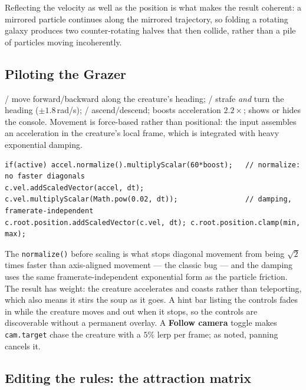 \documentclass[10pt,a4paper]{article}
\newcommand{\code}[1]{\texttt{\small #1}}
\newcommand{\keys}[1]{\textsf{\small\fbox{#1}}}
\begin{document}
\noindent Reflecting the velocity as well as the position is what makes the result coherent: a mirrored
particle continues along the mirrored trajectory, so folding a rotating galaxy produces two
counter-rotating halves that then collide, rather than a pile of particles moving incoherently.

\subsection{Piloting the Grazer}

\keys{W}/\keys{S} move forward/backward along the creature's heading; \keys{A}/\keys{D} strafe \emph{and}
turn the heading ($\pm1.8$\,rad/s); \keys{Q}/\keys{E} ascend/descend; \keys{Shift} boosts acceleration
$2.2\times$; \keys{H} shows or hides the console. Movement is force-based rather than positional: the input
assembles an acceleration in the creature's local frame, which is integrated with heavy exponential
damping.

\begin{lstlisting}
if(active) accel.normalize().multiplyScalar(60*boost);   // normalize: no faster diagonals
c.vel.addScaledVector(accel, dt);
c.vel.multiplyScalar(Math.pow(0.02, dt));                // damping, framerate-independent
c.root.position.addScaledVector(c.vel, dt); c.root.position.clamp(min, max);
\end{lstlisting}

\noindent The \code{normalize()} before scaling is what stops diagonal movement from being $\sqrt2$ times
faster than axis-aligned movement --- the classic bug --- and the damping uses the same
framerate-independent exponential form as the particle friction. The result has weight: the creature
accelerates and coasts rather than teleporting, which also means it stirs the soup as it goes. A hint bar
listing the controls fades in while the creature moves and out when it stops, so the controls are
discoverable without a permanent overlay. A \textbf{Follow camera} toggle makes \code{cam.target} chase the
creature with a $5\%$ lerp per frame; as noted, panning cancels it.

\subsection{Editing the rules: the attraction matrix}
\end{document}
